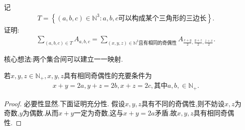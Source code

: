 \documentclass[../../main.tex]{subfiles}%
\begin{document}
\begin{example}
记\begin{align*}
T=\left\{ \left( a,b,c \right) \in \mathbb{N} ^3:a,b,c\text{可以构成某个三角形的三边长} \right\} .
\end{align*}
证明:\begin{align*}
\sum\limits_{\left( a,b,c \right) \in T}{A_{a,b,c}}=\sum\limits_{\left( x,y,z \right) \in \mathbb{N} ^3\text{且有相同的奇偶性}}{A_{\frac{x+y}{2},\frac{y+z}{2},\frac{z+x}{2}}}.
\end{align*}   
\end{example}
\begin{note}
核心想法:两个集合间可以建立一一映射.
\end{note}
\begin{conclusion}
若$x,y,z\in \mathbb{N} _+,x,y,z$具有相同奇偶性的充要条件为
\begin{align*}
x+y=2a,y+z=2b,x+z=2c,\text{其中}a,b,\in \mathbb{N} _+.
\end{align*}
\begin{proof}

必要性显然.下面证明充分性.
假设$x,y,z$具有不同的奇偶性,则不妨设$x,z$为奇数,$y$为偶数.从而$x+y$一定为奇数,这与$x+y=2a$矛盾.故$x,y,z$具有相同奇偶性.

\end{proof}
\end{conclusion}
\end{document}
